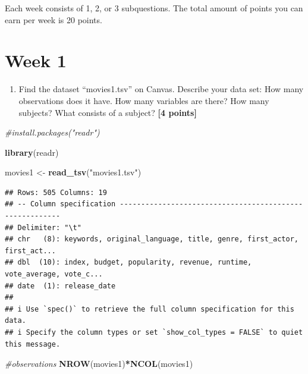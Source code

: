 \documentclass[
]{article}
\newenvironment{Shaded}{\begin{snugshade}}{\end{snugshade}}
\newcommand{\CommentTok}[1]{\textcolor[rgb]{0.56,0.35,0.01}{\textit{#1}}}
\newcommand{\FunctionTok}[1]{\textcolor[rgb]{0.13,0.29,0.53}{\textbf{#1}}}
\newcommand{\NormalTok}[1]{#1}
\newcommand{\OtherTok}[1]{\textcolor[rgb]{0.56,0.35,0.01}{#1}}
\newcommand{\SpecialCharTok}[1]{\textcolor[rgb]{0.81,0.36,0.00}{\textbf{#1}}}
\newcommand{\StringTok}[1]{\textcolor[rgb]{0.31,0.60,0.02}{#1}}
\providecommand{\tightlist}{%
  \setlength{\itemsep}{0pt}\setlength{\parskip}{0pt}}
\begin{document}
Each week consists of 1, 2, or 3 subquestions. The total amount of
points you can earn per week is 20 points.

\section{Week 1}\label{week-1}

\begin{enumerate}
\def\labelenumi{\arabic{enumi}.}
\tightlist
\item
  Find the dataset ``movies1.tsv'' on Canvas. Describe your data set:
  How many observations does it have. How many variables are there? How
  many subjects? What consists of a subject? \textbf{[4 points]}
\end{enumerate}

\begin{Shaded}
\begin{Highlighting}[]
\CommentTok{\#install.packages("readr")}
\end{Highlighting}
\end{Shaded}

\begin{Shaded}
\begin{Highlighting}[]
\FunctionTok{library}\NormalTok{(readr)}
\end{Highlighting}
\end{Shaded}

\begin{Shaded}
\begin{Highlighting}[]
\NormalTok{movies1 }\OtherTok{\textless{}{-}} \FunctionTok{read\_tsv}\NormalTok{(}\StringTok{"movies1.tsv"}\NormalTok{)}
\end{Highlighting}
\end{Shaded}

\begin{verbatim}
## Rows: 505 Columns: 19
## -- Column specification --------------------------------------------------------
## Delimiter: "\t"
## chr   (8): keywords, original_language, title, genre, first_actor, first_act...
## dbl  (10): index, budget, popularity, revenue, runtime, vote_average, vote_c...
## date  (1): release_date
## 
## i Use `spec()` to retrieve the full column specification for this data.
## i Specify the column types or set `show_col_types = FALSE` to quiet this message.
\end{verbatim}

\begin{Shaded}
\begin{Highlighting}[]
\CommentTok{\#observations}
\FunctionTok{NROW}\NormalTok{(movies1)}\SpecialCharTok{*}\FunctionTok{NCOL}\NormalTok{(movies1)}
\end{Highlighting}
\end{Shaded}
\end{document}
